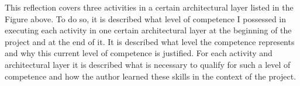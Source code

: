 This reflection covers three activities in a certain architectural layer listed in the Figure above. To do so, it is described what level of competence I possessed in executing each activity in one certain architectural layer at the beginning of the project and at the end of it. It is described what level the competence represents and why this current level of competence is justified. For each activity and architectural layer it is described what is necessary to qualify for such a level of competence and how the author learned these skills in the context of the project.